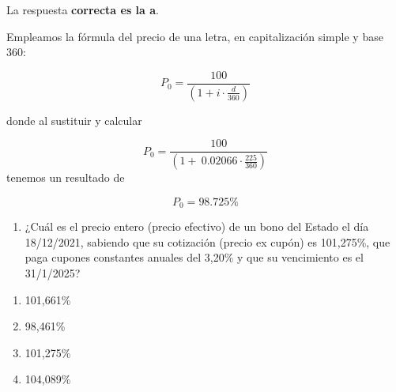 \documentclass[
  letterpaper,
  DIV=11,
  numbers=noendperiod]{scrreprt}
\providecommand{\tightlist}{%
  \setlength{\itemsep}{0pt}\setlength{\parskip}{0pt}}\usepackage{longtable,booktabs,array}
\begin{document}
\begin{tcolorbox}
\begin{tcolorbox}[enhanced jigsaw, toprule=.15mm, left=2mm, arc=.35mm, breakable, bottomrule=.15mm, opacityback=0, rightrule=.15mm, leftrule=.75mm, colframe=quarto-callout-note-color-frame, colback=white]
\begin{minipage}[t]{5.5mm}
\textcolor{quarto-callout-note-color}{\faInfo}
\end{minipage}%
\begin{minipage}[t]{\textwidth - 5.5mm}

La respuesta \textbf{correcta es la a}.

Empleamos la fórmula del precio de una letra, en capitalización simple y
base 360:

\[P_0=\frac{100}{\left(1+i\cdot \frac{d}{360}\right)}\]

donde al sustituir y calcular

\[P_0=\frac{100}{\left(1+\:0.02066\cdot \frac{225}{360}\right)}\]
tenemos un resultado de

\[P_0=98.725\% \]

\end{minipage}%
\end{tcolorbox}

\begin{enumerate}
\def\labelenumi{\arabic{enumi}.}
\setcounter{enumi}{5}
\tightlist
\item
  ¿Cuál es el precio entero (precio efectivo) de un bono del Estado el
  día 18/12/2021, sabiendo que su cotización (precio ex cupón) es
  101,275\%, que paga cupones constantes anuales del 3,20\% y que su
  vencimiento es el 31/1/2025?
\end{enumerate}

\begin{enumerate}
\def\labelenumi{\alph{enumi}.}
\item
  101,661\%
\item
  98,461\%
\item
  101,275\%
\item
  104,089\%
\end{enumerate}

\begin{tcolorbox}[enhanced jigsaw, toprule=.15mm, left=2mm, arc=.35mm, breakable, bottomrule=.15mm, opacityback=0, rightrule=.15mm, leftrule=.75mm, colframe=quarto-callout-note-color-frame, colback=white]
\begin{minipage}[t]{5.5mm}
\textcolor{quarto-callout-note-color}{\faInfo}
\end{minipage}%
\begin{minipage}[t]{\textwidth - 5.5mm}


\end{minipage}
\end{tcolorbox}
\end{tcolorbox}
\end{document}
